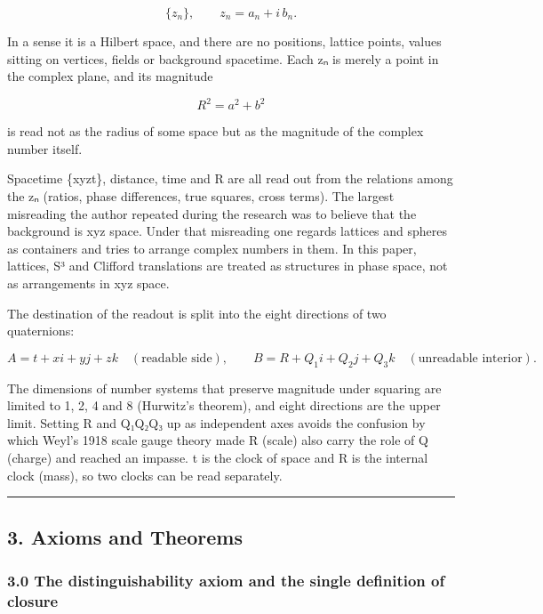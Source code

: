 \documentclass[
  a4paper,
]{article}
\begin{document}
\[
\{z_n\},\qquad z_n=a_n+i\,b_n .
\]

In a sense it is a Hilbert space, and there are no positions, lattice
points, values sitting on vertices, fields or background spacetime. Each
zₙ is merely a point in the complex plane, and its magnitude

\[
R^2=a^2+b^2
\]

is read not as the radius of some space but as the magnitude of the
complex number itself.

Spacetime \{xyzt\}, distance, time and R are all read out from the
relations among the zₙ (ratios, phase differences, true squares, cross
terms). The largest misreading the author repeated during the research
was to believe that the background is xyz space. Under that misreading
one regards lattices and spheres as containers and tries to arrange
complex numbers in them. In this paper, lattices, S³ and Clifford
translations are treated as structures in phase space, not as
arrangements in xyz space.

The destination of the readout is split into the eight directions of two
quaternions:

\[
A=t+xi+yj+zk\quad(\text{readable side}),\qquad B=R+Q_1i+Q_2j+Q_3k\quad(\text{unreadable interior}) .
\]

The dimensions of number systems that preserve magnitude under squaring
are limited to 1, 2, 4 and 8 (Hurwitz's theorem), and eight directions
are the upper limit. Setting R and Q₁Q₂Q₃ up as independent axes avoids
the confusion by which Weyl's 1918 scale gauge theory made R (scale)
also carry the role of Q (charge) and reached an impasse. t is the clock
of space and R is the internal clock (mass), so two clocks can be read
separately.

\begin{center}\rule{0.5\linewidth}{0.5pt}\end{center}

\subsection{3. Axioms and Theorems}\label{axioms-and-theorems}

\subsubsection{3.0 The distinguishability axiom and the single
definition of
closure}\label{the-distinguishability-axiom-and-the-single-definition-of-closure}
\end{document}
